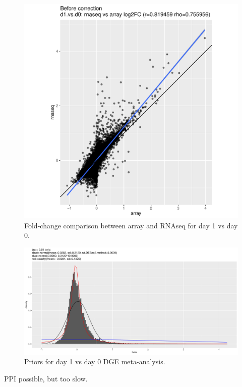 \begin{figure}
    \includegraphics[width=1.0\textwidth]{./mainmatter/figures/chapter_02/meta.rnaseqVsArray.log2FC.beforeBiasCorrection.coefName_d1.vs.d0.pdf}
    \caption{Fold-change comparison between array and RNAseq for day 1 vs day 0.}
\end{figure}

\begin{figure}
    \includegraphics[width=1.0\textwidth]{./mainmatter/figures/chapter_02/meta.bayesmeta.priors.coefName_d1.vs.d0.pdf}
    \caption{Priors for day 1 vs day 0 DGE meta-analysis.}
\end{figure}

PPI possible, but too slow.

